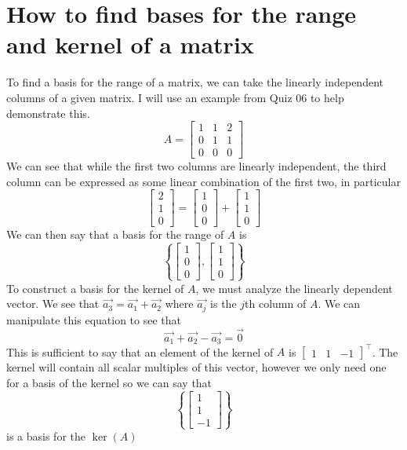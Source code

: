 \documentclass{report}
\begin{document}
\section{How to find bases for the range and kernel of a matrix}
To find a basis for the range of a matrix,  we can take the linearly independent columns of a given matrix.  I will use an example from Quiz 06 to help demonstrate this.
$$
A = \begin{bmatrix}1&1&2\\0&1&1\\0&0&0\end{bmatrix}
$$
We can see that while the first two columns are linearly independent,  the third column can be expressed as some linear combination of the first two,  in particular
$$
\begin{bmatrix}2\\1\\0\end{bmatrix} = \begin{bmatrix}1\\0\\0\end{bmatrix} + \begin{bmatrix}1\\1\\0\end{bmatrix}
$$
We can then say that a basis for the range of $A$ is
$$
\left\{\begin{bmatrix}1\\0\\0\end{bmatrix},\begin{bmatrix}1\\1\\0\end{bmatrix}\right\}
$$
To construct a basis for the kernel of $A$,  we must analyze the linearly dependent vector.  We see that $\vec{a_3} = \vec{a_1} + \vec{a_2}$ where $\vec{a_j}$ is the $j$th column of $A$.  We can manipulate this equation to see that
$$
\vec{a_1}+\vec{a_2}-\vec{a_3} = \vec{0}
$$
This is sufficient to say that an element of the kernel of $A$ is $\begin{bmatrix}1&1&-1\end{bmatrix}^\top$.  The kernel will contain all scalar multiples of this vector,  however we only need one for a basis of the kernel so we can say that
$$
\left\{\begin{bmatrix}1\\1\\-1\end{bmatrix}\right\}
$$
is a basis for the $\ker(A)$
\end{document}
